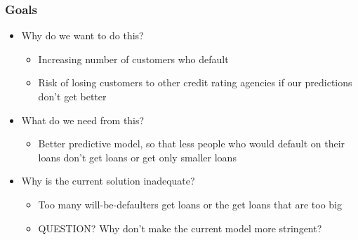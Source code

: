 \documentclass[10pt]{beamer}
\begin{document}
\begin{frame}
\frametitle{Goals}

\begin{itemize}
    \item Why do we want to do this?
    \pause
    \begin{itemize}
        \item Increasing number of customers who default
        \pause
        \item Risk of losing customers to other credit rating agencies
        if our predictions don't get better
        \pause
    \end{itemize}
    \item What do we need from this?
    \pause
    \begin{itemize}
        \item Better predictive model, so that less people who would default on
        their loans don't get loans or get only smaller loans
        \pause
    \end{itemize}
    \item Why is the current solution inadequate?
    \pause
    \begin{itemize}
        \item Too many will-be-defaulters get loans or the get loans that are too big
        \pause
        \item QUESTION? Why don't make the current model more stringent?
    \end{itemize}
\end{itemize}

\end{frame}
\end{document}
